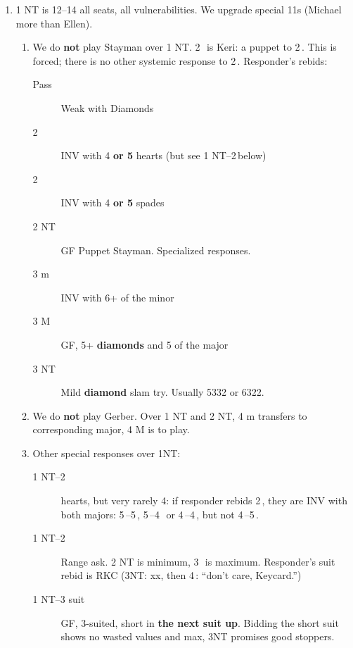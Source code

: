 \documentclass[12pt]{article}
\begin{document}
\begin{scriptsize}
    \begin{enumerate}
        \item \label{itm:1nt}1 NT is 12--14 all seats, all vulnerabilities.
         We upgrade special 11s (Michael more than Ellen).
        \begin{enumerate}[label*=\arabic*,nosep]
            \item \label{itm:1nt2c}We do \textbf{not} play Stayman over 1 NT.  2\,\bc\ is Keri: a puppet to 2\,\rd.
            This is forced; there is no other systemic response to 2\,\bc.
            Responder's rebids:
            \begin{description}
                \item [Pass] Weak with Diamonds
                \item [2\,\rh] INV with 4 \textbf{or 5} hearts (but see 1 NT--2\,\rd below)
                \item [2\,\bs] INV with 4 \textbf{or 5} spades
                \item [2 NT] GF Puppet Stayman.
                 Specialized responses.
                \item [3 m] INV with 6+ of the minor
                \item [3 M] GF, 5+ \textbf{diamonds} and 5 of the major
                \item [3 NT] Mild \textbf{diamond} slam try.
                 Usually 5332 or 6322.
            \end{description}
            \item We do \textbf{not} play Gerber.
            Over 1 NT and 2 NT, 4 m transfers to corresponding major, 4 M is to play.
            \item \label{itm:1ntother}Other special responses over 1NT:
            \begin{description}
                \item [1 NT--2\,\rd] hearts, but very rarely 4: if responder rebids 2\,\bs,
                      they are INV with both majors: 5\,\bs--5\,\rh, 5\,\bs--4\,\rh\ or 4\,\bs--4\,\rh, but not 4\,\bs--5\,\rh.
                \item [1 NT--2\,\bs] Range ask.
                2 NT is minimum, 3\,\bc\ is maximum.
                Responder's suit rebid is RKC (3NT: xx, then 4\,\bc: ``don't care, Keycard.'')
                \item [1 NT--3 suit] GF, 3-suited, short in \textbf{the next suit up}.
                 Bidding the short suit shows no wasted values and max, 3NT promises good stoppers.

\end{description}
\end{enumerate}
\end{enumerate}
\end{scriptsize}
\end{document}
